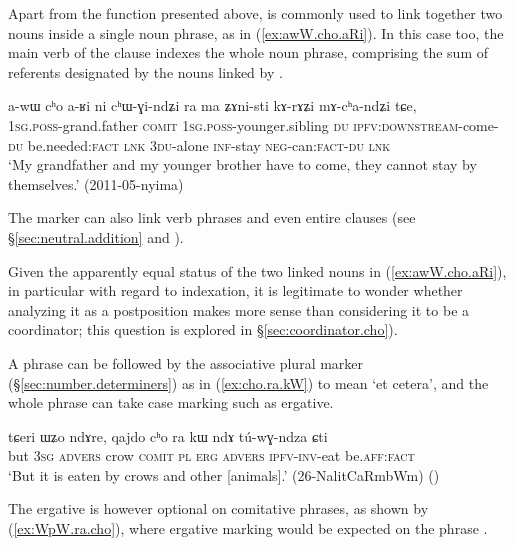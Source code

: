  Apart from the function presented above,  is commonly used to link together two nouns inside a single noun phrase, as in (\ref{ex:awW.cho.aRi}). In this case too, the main verb of the clause indexes the whole noun phrase, comprising the sum of referents designated by the nouns linked by .

\begin{exe}
\ex \label{ex:awW.cho.aRi}
\gll a-wɯ cʰo a-ʁi ni cʰɯ-ɣi-ndʑi ra ma ʑɤni-sti kɤ-rɤʑi mɤ-cʰa-ndʑi tɕe, \\
\textsc{1sg}.\textsc{poss}-grand.father \textsc{comit} \textsc{1sg}.\textsc{poss}-younger.sibling \textsc{du} \textsc{ipfv}:\textsc{downstream}-come-\textsc{du} be.needed:\textsc{fact} \textsc{lnk} \textsc{3du}-alone \textsc{inf}-stay \textsc{neg}-can:\textsc{fact}-\textsc{du} \textsc{lnk} \\ 
\glt `My grandfather and my younger brother have to come, they cannot stay by themselves.' (2011-05-nyima)
\end{exe}

The marker  can also link verb phrases and even entire clauses (see §\ref{sec:neutral.addition} and \citealt[313]{jacques14linking}).

Given the apparently equal status of the two linked nouns in (\ref{ex:awW.cho.aRi}), in particular with regard to indexation, it is legitimate to wonder whether analyzing it as a postposition makes more sense than considering it to be a coordinator; this question is explored in §\ref{sec:coordinator.cho}). 

A  phrase can be followed by the associative plural marker  (§\ref{sec:number.determiners}) as in (\ref{ex:cho.ra.kW}) to mean `et cetera', and the whole phrase can take case marking such as ergative.

\begin{exe}
\ex \label{ex:cho.ra.kW}
\gll tɕeri ɯʑo ndɤre, qajdo cʰo ra kɯ ndɤ tú-wɣ-ndza ɕti \\
but \textsc{3sg} \textsc{advers} crow \textsc{comit} \textsc{pl} \textsc{erg} \textsc{advers} \textsc{ipfv}-\textsc{inv}-eat be.\textsc{aff}:\textsc{fact} \\
\glt `But it is eaten by crows and other [animals].' (26-NalitCaRmbWm)
()
\end{exe}

The ergative  is however optional on comitative phrases, as shown by (\ref{ex:WpW.ra.cho}), where ergative marking would be expected on the phrase .

